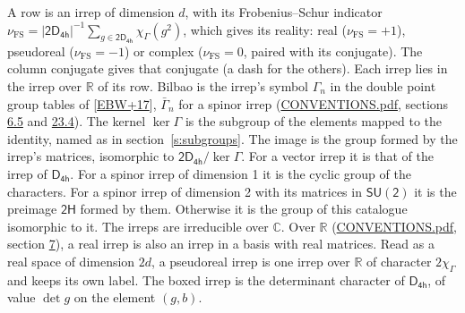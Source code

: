 \documentclass[10pt,a4paper]{article}
\numberwithin{equation}{section}
\newcommand{\grp}[1]{\mathsf{#1}}
\newcommand{\irchar}[1]{\chi_{#1}}
\newcommand{\fsind}{\nu_{\mathrm{FS}}}
\begin{document}
\leavevmode\label{n:index.frobenius}\label{n:head.irrep}\label{n:head.reality}A row is an irrep of dimension $d$, with its Frobenius--Schur indicator $\fsind = |\grp{2D_{4h}}|^{-1}\allowbreak\sum_{g\in\grp{2D_{4h}}}\irchar{\Gamma}(g^2)$, which gives its reality: real ($\fsind = +1$), pseudoreal ($\fsind = -1$) or complex ($\fsind = 0$, paired with its conjugate). \label{n:head.conjugate}The column conjugate gives that conjugate (a dash for the others). \label{n:head.over.real}Each irrep lies in the irrep over $\mathbb{R}$ of its row. \label{n:head.bilbao}\label{n:irrep.alias.gamma}Bilbao is the irrep's symbol $\Gamma_n$ in the double point group tables of [\href{../../../REFERENCES.pdf\#ref.EBW+17}{EBW+17}], $\bar{\Gamma}_n$ for a spinor irrep (\href{../../CONVENTIONS.pdf}{CONVENTIONS.pdf}, sections \href{../../../rotation/CONVENTIONS.pdf\#conv.6.5}{6.5} and \href{../../CONVENTIONS.pdf\#conv.23.4}{23.4}). \label{n:head.kernel}The kernel $\ker\Gamma$ is the subgroup of the elements mapped to the identity, named as in section~\ref{s:subgroups}. \label{n:head.image}The image is the group formed by the irrep's matrices, isomorphic to $\grp{2D_{4h}}/\ker\Gamma$. For a vector irrep it is that of the irrep of \href{../../../rotation/data/pdf/D4h.pdf}{$\grp{D_{4h}}$}. For a spinor irrep of dimension 1 it is the cyclic group of the characters. For a spinor irrep of dimension 2 with its matrices in $\grp{SU(2)}$ it is the preimage $\grp{2H}$ formed by them. Otherwise it is the group of this catalogue isomorphic to it. The irreps are irreducible over $\mathbb{C}$. Over $\mathbb{R}$ (\href{../../CONVENTIONS.pdf}{CONVENTIONS.pdf}, section \href{../../../rotation/CONVENTIONS.pdf\#conv.7}{7}), a real irrep is also an irrep in a basis with real matrices. Read as a real space of dimension $2d$, a pseudoreal irrep is one irrep over $\mathbb{R}$ of character $2\irchar{\Gamma}$ and keeps its own label. \label{n:mark.determinant}The boxed irrep is the determinant character of \href{../../../rotation/data/pdf/D4h.pdf}{$\grp{D_{4h}}$}, of value $\det g$ on the element $(g, b)$.
\setlength{\emergencystretch}{2em}\par\setlength{\emergencystretch}{0pt}
\end{document}
